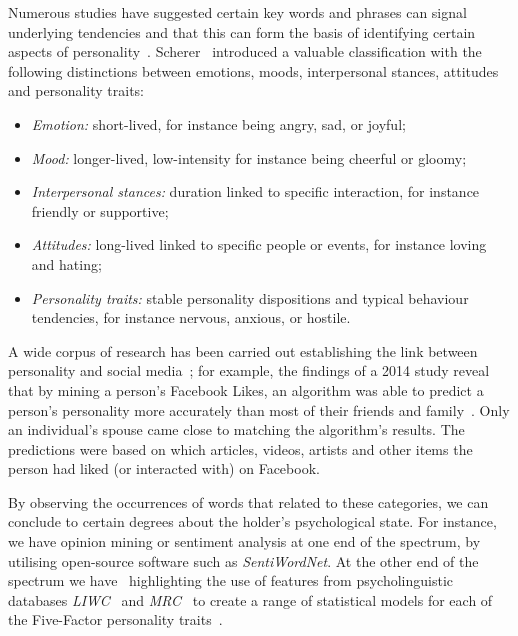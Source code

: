 \documentclass[conference]{IEEEtran}
\begin{document}
Numerous studies have suggested certain key words and phrases can
signal underlying tendencies and that this can form the basis of
identifying certain aspects of
personality~\cite{woodworth-et-al:2012,iacobelli-et-al:2011,pennebaker+king:1999,oberlander+gill:2004,oberlander+gill:2006}. Scherer~\cite{scherer:1984}
introduced a valuable classification with the following distinctions
between emotions, moods, interpersonal stances, attitudes and
personality traits:

\begin{itemize}
\item {\emph{Emotion:}} short-lived, for instance being angry, sad, or joyful;
\item {\emph{Mood:}} longer-lived, low-intensity for instance being cheerful or gloomy;
\item {\emph{Interpersonal stances:}} duration linked to specific
  interaction, for instance friendly or supportive;
\item {\emph{Attitudes:}} long-lived linked to specific people or
  events, for instance loving and hating;
\item {\emph{Personality traits:}} stable personality dispositions and
  typical behaviour tendencies, for instance nervous, anxious, or hostile.
\end{itemize}

A wide corpus of research has been carried out establishing the link
between personality and social
media~\cite{vazire+gosling:2004,iacobelli-et-al:2011,blamey-et-al-2012};
for example, the findings of a 2014 study reveal that by mining a
person's Facebook Likes, an algorithm was able to predict a person's
personality more accurately than most of their friends and
family~\cite{youyou-et-al:2014}. Only an individual's spouse came
close to matching the algorithm's results. The predictions were based
on which articles, videos, artists and other items the person had
liked (or interacted with) on Facebook.

By observing the occurrences of words that related to these
categories, we can conclude to certain degrees about the holder's
psychological state. For instance, we have opinion mining or sentiment
analysis at one end of the spectrum, by utilising open-source software
such as {\emph{SentiWordNet}}. At the other end of the spectrum we
have~\cite{mairesse-et-al:2007} highlighting the use of features from
psycholinguistic databases {\emph{LIWC}}~\cite{pennebaker-et-al:2001}
and {\emph{MRC}}~\cite{wilson:1988} to create a range of statistical
models for each of the Five-Factor personality
traits~\cite{norman:1963,peabody+goldberg:1989}.
\end{document}
